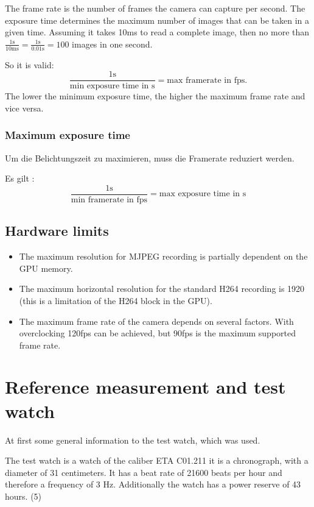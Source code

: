 \documentclass[12pt, a4paper]{report}
\begin{document}
The frame rate is the number of frames the camera can capture per second. The exposure time determines the maximum number of images that can be taken in a given time. Assuming it takes 10ms to read a complete image, then no more than $\frac{1 \text{s} }{10 \text{ms}} = \frac{1\text{s}}{0.01\text{s}} = 100 $ images in one second. 

\bigskip

So it is valid: 
\begin{displaymath}
\frac{1\text{s}}{\text{min exposure time in s}} = \text{max framerate in
fps.} 
\end{displaymath}
The lower the minimum exposure time, the higher the maximum frame rate and vice versa.

\subsubsection{Maximum exposure time}
Um die Belichtungszeit zu maximieren, muss die Framerate reduziert werden. 

Es gilt :
\begin{displaymath}
\frac{1\text{s}}{\text{min framerate in fps}} = \text{max exposure time
in s}
\end{displaymath} 

\subsection{Hardware limits}

\begin{itemize}
\item The maximum resolution for MJPEG recording is partially dependent on the GPU memory.
\item The maximum horizontal resolution for the standard H264 recording is 1920 (this is a limitation of the H264 block in the GPU).
\item The maximum frame rate of the camera depends on several factors. With overclocking 120fps can be achieved, but 90fps is the maximum supported frame rate.

\end{itemize}


\section{Reference measurement and test watch}
At first some general information to the test watch, which was used.

The test watch is a watch of the caliber ETA C01.211 it is a chronograph, with a diameter of 31 centimeters. It has a beat rate of 21600 beats per hour and therefore a frequency of 3 Hz. Additionally the watch has a power reserve of 43 hours. (5)
\end{document}
